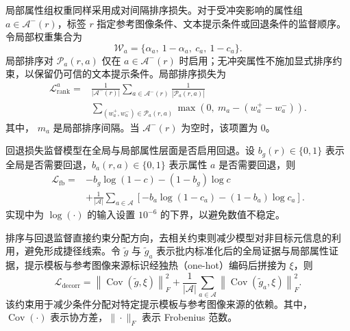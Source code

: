 \documentclass[journal]{IEEEtran}
\begin{document}
局部属性组权重同样采用成对间隔排序损失。对于受冲突影响的属性组 $a\in\mathcal{A}^{-}(r)$，标签 $r$ 指定参考图像条件、文本提示条件或回退条件的监督顺序。令局部权重集合为
\begin{equation}
\label{eq:slot_weight_set}
\mathcal{W}_a=\{\alpha_a,\ 1-\alpha_a,\ c_a,\ 1-c_a\}.
\end{equation}
局部排序对 $\mathcal{P}_a(r,a)$ 仅在 $a\in\mathcal{A}^{-}(r)$ 时启用；无冲突属性不施加显式排序约束，以保留仍可信的文本提示条件。局部排序损失为
\begin{equation}
\label{eq:slot_rank_loss}
\begin{aligned}
\mathcal{L}^{a}_{\mathrm{rank}}
=&
\frac{1}{|\mathcal{A}^{-}(r)|}
\sum_{a\in\mathcal{A}^{-}(r)}
\frac{1}{|\mathcal{P}_a(r,a)|}
\\[-1pt]
&\sum_{(w_a^+,w_a^-)\in\mathcal{P}_a(r,a)}
\max\!\left(0,\ m_a-(w_a^+-w_a^-)\right).
\end{aligned}
\end{equation}
其中， $m_a$ 是局部排序间隔。当 $\mathcal{A}^{-}(r)$ 为空时，该项置为 $0$。

回退损失监督模型在全局与局部属性层面是否启用回退。设 $b_g(r)\in\{0,1\}$ 表示全局是否需要回退，$b_a(r,a)\in\{0,1\}$ 表示属性 $a$ 是否需要回退，则
\begin{equation}
\label{eq:fallback_loss}
\begin{aligned}
\mathcal{L}_{\mathrm{fb}}
=&
-b_g\log(1-c)-(1-b_g)\log c\\
&+
\frac{1}{|\mathcal{A}|}
\sum_{a\in\mathcal{A}}
\left[-b_a\log(1-c_a)-(1-b_a)\log c_a\right].
\end{aligned}
\end{equation}
实现中为 $\log(\cdot)$ 的输入设置 $10^{-6}$ 的下界，以避免数值不稳定。

排序与回退监督直接约束分配方向，去相关约束则减少模型对非目标元信息的利用，避免形成捷径线索。令 $\tilde{g}$ 与 $\tilde{g}_a$ 表示批内标准化后的全局证据与局部属性证据，提示模板与参考图像来源标识经独热（one-hot）编码后拼接为 $\xi$，则
\begin{equation}
\label{eq:decorrelation_loss}
\mathcal{L}_{\mathrm{decorr}}
=
\left\|\operatorname{Cov}(\tilde{g},\xi)\right\|_F^2
+
\frac{1}{|\mathcal{A}|}
\sum_{a\in\mathcal{A}}
\left\|\operatorname{Cov}(\tilde{g}_a,\xi)\right\|_F^2.
\end{equation}
该约束用于减少条件分配对特定提示模板与参考图像来源的依赖。其中，$\operatorname{Cov}(\cdot)$ 表示协方差，$\|\cdot\|_F$ 表示 Frobenius 范数。
\end{document}
